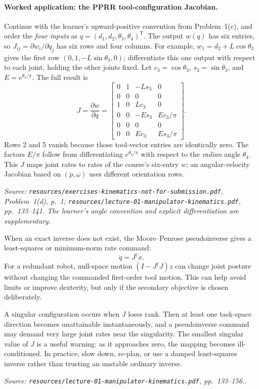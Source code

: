\documentclass[11pt,a4paper]{article}
\renewcommand{\texttt}[1]{\nolinkurl{#1}}
\newcommand{\trans}{\mathsf{T}}
\newcommand{\source}[1]{\par\smallskip\noindent\textit{Source: #1.}\par\smallskip}
\begin{document}
\paragraph{Worked application: the PPRR tool-configuration Jacobian.}
Continue with the learner's upward-positive convention from Problem~1(c), and order the
\emph{four inputs} as $q=(d_1,d_2,\theta_3,\theta_4)^\trans$.
The output $w(q)$ has six entries, so $J_{ij}=\partial w_i/\partial q_j$
has six rows and four columns. For example, $w_1=d_2+L\cos\theta_3$ gives
the first row $(0,1,-L\sin\theta_3,0)$: differentiate this one output
with respect to each joint, holding the other joints fixed.
Let $c_3=\cos\theta_3$, $s_3=\sin\theta_3$, and $E=e^{\theta_4/\pi}$.
The full result is
\[
 J=\frac{\partial w}{\partial q}=
 \begin{bmatrix}
 0&1&-Ls_3&0\\
 0&0&0&0\\
 1&0&Lc_3&0\\
 0&0&-Es_3&Ec_3/\pi\\
 0&0&0&0\\
 0&0&Ec_3&Es_3/\pi
 \end{bmatrix}.
\]
Rows 2 and 5 vanish because those tool-vector entries are identically zero.
The factors $E/\pi$ follow from differentiating $e^{\theta_4/\pi}$ with
respect to the \emph{radian} angle $\theta_4$. This $J$ maps joint rates to
rates of the course's six-entry $w$; an angular-velocity Jacobian based on
$(\dot p,\omega)$ uses different orientation rows.
\source{\texttt{resources/exercises-kinematics-not-for-submission.pdf}, Problem~1(d), p.~1; \texttt{resources/lecture-01-manipulator-kinematics.pdf}, pp.~133--141. The learner's angle convention and explicit differentiation are supplementary}

When an exact inverse does not exist, the Moore--Penrose pseudoinverse gives a least-squares or minimum-norm rate command:
\[
 \dot q=J^\dagger\dot x.
\]
For a redundant robot, null-space motion $(I-J^\dagger J)z$ can change joint posture without changing the commanded first-order tool motion. This can help avoid limits or improve dexterity, but only if the secondary objective is chosen deliberately.

A singular configuration occurs when $J$ loses rank. Then at least one task-space direction becomes unattainable instantaneously, and a pseudoinverse command may demand very large joint rates near the singularity. The smallest singular value of $J$ is a useful warning: as it approaches zero, the mapping becomes ill-conditioned. In practice, slow down, re-plan, or use a damped least-squares inverse rather than trusting an unstable ordinary inverse.
\source{\texttt{resources/lecture-01-manipulator-kinematics.pdf}, pp.~133--156.}
\end{document}
